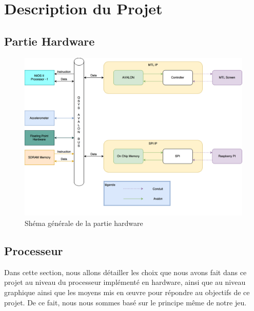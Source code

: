 

\tableofcontents

\chapter{Description du Projet}



\begin{landscape}

\chapter{Partie Hardware}
\begin{figure}[!ht]

\centering

\includegraphics[scale=0.17]{img/Projet_Master.png}
\caption{Shéma générale de la partie hardware}
\label{fig1}

\end{figure}

\end{landscape}

\newpage
\section{Processeur}

Dans cette section, nous allons détailler les choix que nous avons fait dans ce projet au niveau du processeur implémenté en hardware, ainsi que au niveau graphique ainsi que les moyens mis en œuvre pour répondre au objectifs de ce projet. De ce fait, nous nous sommes basé sur le principe même de notre jeu.

